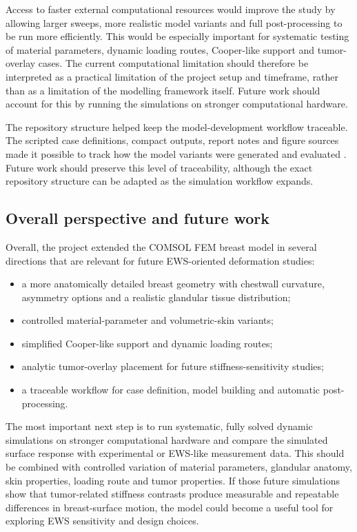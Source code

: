 Access to faster external computational resources would improve the study by allowing larger sweeps, more realistic model variants and full post-processing to be run more efficiently. This would be especially important for systematic testing of material parameters, dynamic loading routes, Cooper-like support and tumor-overlay cases. The current computational limitation should therefore be interpreted as a practical limitation of the project setup and timeframe, rather than as a limitation of the modelling framework itself. Future work should account for this by running the simulations on stronger computational hardware.

The repository structure helped keep the model-development workflow traceable. The scripted case definitions, compact outputs, report notes and figure sources made it possible to track how the model variants were generated and evaluated \cite{KuijpersEWSComsolGitHub}. Future work should preserve this level of traceability, although the exact repository structure can be adapted as the simulation workflow expands.



\subsection{Overall perspective and future work}
\label{discussion_overall_perspective_future_work}

Overall, the project extended the COMSOL FEM breast model in several directions that are relevant for future EWS-oriented deformation studies:

\begin{itemize}
    \item a more anatomically detailed breast geometry with chestwall curvature, asymmetry options and a realistic glandular tissue distribution;
    \item controlled material-parameter and volumetric-skin variants;
    \item simplified Cooper-like support and dynamic loading routes;
    \item analytic tumor-overlay placement for future stiffness-sensitivity studies;
    \item a traceable workflow for case definition, model building and automatic post-processing.
\end{itemize}

The most important next step is to run systematic, fully solved dynamic simulations on stronger computational hardware and compare the simulated surface response with experimental or EWS-like measurement data. This should be combined with controlled variation of material parameters, glandular anatomy, skin properties, loading route and tumor properties. If those future simulations show that tumor-related stiffness contrasts produce measurable and repeatable differences in breast-surface motion, the model could become a useful tool for exploring EWS sensitivity and design choices.
